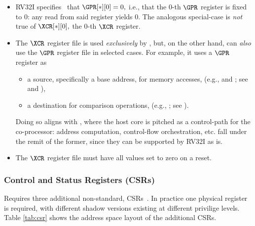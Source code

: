 \begin{itemize}
\item RV32I specifies~\cite[Section 2.1]{SCARV:RV:ISA:I:17} that
      $
      \GPR[*][0] = 0 ,
      $
      i.e., that the $0$-th $\GPR$ register is fixed to $0$: any read from 
      said register yields $0$.  The analogous special-case is {\em not} 
      true of 
      $
      \XCR[*][0] ,
      $
      the $0$-th $\XCR$ register.
\item The $\XCR$ register file is used {\em exclusively} by \XCID, but, on
      the other hand, \XCID can {\em also} use the $\GPR$ register file in 
      selected cases.  For example, it uses a $\GPR$ register as

      \begin{itemize}
      \item a source, specifically a base address, for memory accesses,
            (e.g.,  and ; see  and ),
      \item a destination for comparison operations,
            (e.g., ; see ).
      \end{itemize}

      \noindent
      Doing so aligns with , where the host core is 
      pitched as a control-path for the co-processor: address computation,
      control-flow orchestration, etc. fall under the remit of the former, 
      since they can be supported by RV32I as is.
\item The $\XCR$ register file must have all values set to zero on a reset.
\end{itemize}    


\subsubsection{Control and Status Registers (CSRs)}
\label{sec:spec:state:csr}

\XCID 
Requires three additional
non-standard, CSRs~\cite[Section 2]{SCARV:RV:ISA:II:17}.
In practice one physical register is required, with different shadow
versions existing at different privilige levels.
Table \ref{tab:csr} shows the address space layout of the additional
CSRs.

